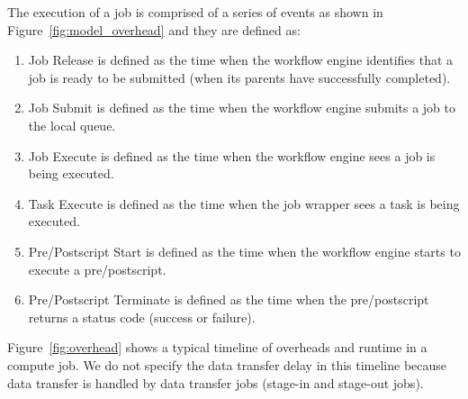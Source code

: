 \documentclass[final,5p,times,twocolumn]{elsarticle}
\begin{document}
The execution of a job is comprised of a series of events as shown in Figure~\ref{fig:model_overhead} and they are defined as:

\begin{enumerate}
\item Job Release is defined as the time when the workflow engine identifies that a job is ready to be submitted (when its parents have successfully completed). 
\item Job Submit is defined as the time when the workflow engine submits a job to the local queue. 
\item Job Execute is defined as the time when the workflow engine sees a job is being executed. 
\item Task Execute is defined as the time when the job wrapper sees a task is being executed. 
\item Pre/Postscript Start is defined as the time when the workflow engine starts to execute a pre/postscript. 
\item Pre/Postscript Terminate is defined as the time when the pre/postscript returns a status code (success or failure). 
\end{enumerate}

Figure~\ref{fig:overhead} shows a typical timeline of overheads and runtime in a compute job. We do not specify the data transfer delay in this timeline because data transfer is handled by data transfer jobs (stage-in and stage-out jobs). 
\end{document}
